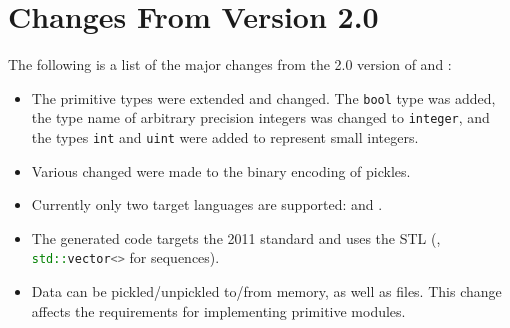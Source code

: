\section{Changes From Version 2.0}
\label{sec:changes}

The following is a list of the major changes from the 2.0 version of \asdl{}
and \asdlgen{}:
\begin{itemize}
  \item
    The primitive types were extended and changed.
    The \lstinline!bool! type was added, the type name of arbitrary precision integers
    was changed to \lstinline!integer!, and the types \lstinline!int! and \lstinline!uint!
    were added to represent small integers.
  \item
    Various changed were made to the binary encoding of pickles.
  \item
    Currently only two target languages are supported: \sml{} and \Cplusplus{}.
  \item
    The generated \Cplusplus{} code targets the 2011 standard and uses the
    \Cplusplus{} STL (\eg{}, \lstinline[language=C++]!std::vector<>! for \asdl{} sequences).
  \item
    Data can be pickled/unpickled to/from memory, as well as files.
    This change affects the requirements for implementing primitive modules.
\end{itemize}%
